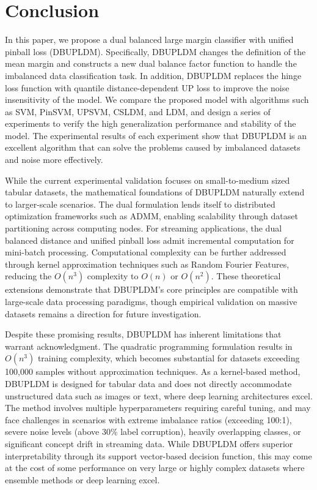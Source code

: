 \documentclass[a4paper]{cas-sc}
\begin{document}
\section{Conclusion}\label{conclusion}
In this paper, we propose a dual balanced large margin classifier with unified pinball loss (DBUPLDM). Specifically, DBUPLDM changes the definition of the mean margin and constructs a new dual balance factor function to handle the imbalanced data classification task. In addition, DBUPLDM replaces the hinge loss function with quantile distance-dependent UP loss to improve the noise insensitivity of the model. We compare the proposed model with algorithms such as SVM, PinSVM, UPSVM, CSLDM, and LDM, and design a series of experiments to verify the high generalization performance and stability of the model. The experimental results of each experiment show that DBUPLDM is an excellent algorithm that can solve the problems caused by imbalanced datasets and noise more effectively.

{\color{magenta}While the current experimental validation focuses on small-to-medium sized tabular datasets, the mathematical foundations of DBUPLDM naturally extend to larger-scale scenarios. The dual formulation lends itself to distributed optimization frameworks such as ADMM, enabling scalability through dataset partitioning across computing nodes. For streaming applications, the dual balanced distance and unified pinball loss admit incremental computation for mini-batch processing. Computational complexity can be further addressed through kernel approximation techniques such as Random Fourier Features, reducing the $O(n^3)$ complexity to $O(n)$ or $O(n^2)$. These theoretical extensions demonstrate that DBUPLDM's core principles are compatible with large-scale data processing paradigms, though empirical validation on massive datasets remains a direction for future investigation.

Despite these promising results, DBUPLDM has inherent limitations that warrant acknowledgment. The quadratic programming formulation results in $O(n^3)$ training complexity, which becomes substantial for datasets exceeding 100,000 samples without approximation techniques. As a kernel-based method, DBUPLDM is designed for tabular data and does not directly accommodate unstructured data such as images or text, where deep learning architectures excel. The method involves multiple hyperparameters requiring careful tuning, and may face challenges in scenarios with extreme imbalance ratios (exceeding 100:1), severe noise levels (above 30\% label corruption), heavily overlapping classes, or significant concept drift in streaming data. While DBUPLDM offers superior interpretability through its support vector-based decision function, this may come at the cost of some performance on very large or highly complex datasets where ensemble methods or deep learning excel.}
\end{document}
